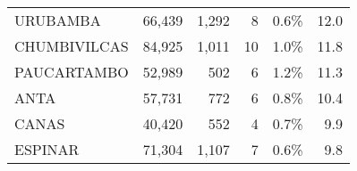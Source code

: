 \begin{tabular}{lrrrrr}
	\cellcolor[HTML]{FFFC9E}URUBAMBA      & 66,439                                                         & 1,292                                                                           & 8                                                              & 0.6\%                                                                  & 12.0                                                                                                                               \\
	\cellcolor[HTML]{FFFC9E}CHUMBIVILCAS  & 84,925                                                         & 1,011                                                                           & 10                                                             & 1.0\%                                                                  & 11.8                                                                                                                               \\
	\cellcolor[HTML]{FFFC9E}PAUCARTAMBO   & 52,989                                                         & 502                                                                             & 6                                                              & 1.2\%                                                                  & 11.3                                                                                                                               \\
	\cellcolor[HTML]{FFFC9E}ANTA          & 57,731                                                         & 772                                                                             & 6                                                              & 0.8\%                                                                  & 10.4                                                                                                                               \\
	\cellcolor[HTML]{FFFC9E}CANAS         & 40,420                                                         & 552                                                                             & 4                                                              & 0.7\%                                                                  & 9.9                                                                                                                                \\
	\cellcolor[HTML]{FFFC9E}ESPINAR       & 71,304                                                         & 1,107                                                                           & 7                                                              & 0.6\%                                                                  & 9.8                                                                                                                                \\

\end{tabular}
